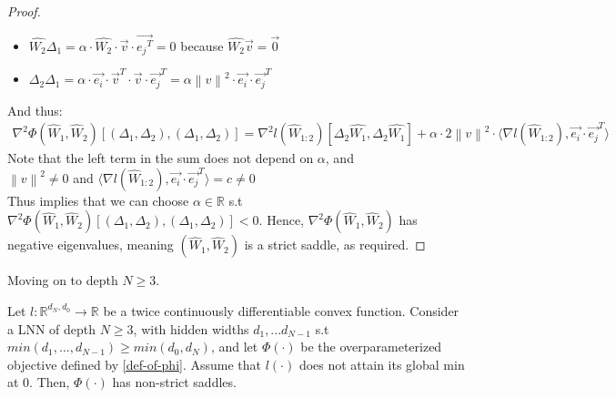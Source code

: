 \documentclass[12pt]{article}
\newcommand{\norm}[1]{\left\| #1 \right\|}
\begin{document}
\begin{proof}
\begin{itemize}
        \item $\widehat{W_2}\Delta_1 = \alpha \cdot \widehat{W_2} \cdot \overrightarrow{v} \cdot \overrightarrow{{e_j}^T} = 0$ because $\widehat{W_2}\overrightarrow{v} = \overrightarrow{0}$
        \item $\Delta_2 \Delta_1 = 
        \alpha \cdot \overrightarrow{e_i} \cdot {\overrightarrow{v}^T}
        \cdot \overrightarrow{v} \cdot {\overrightarrow{e_j}^T} = 
        \alpha {\norm{v}^2} \cdot \overrightarrow{e_i}\cdot{\overrightarrow{e_j}^T}$
    \end{itemize}
    And thus:
    \begin{align*}
        {{\nabla}^{2}}{\Phi}({\widehat{W}_1}, {\widehat{W}_2})[
        (\Delta_1,\Delta_2),
        (\Delta_1,\Delta_2)
        ]
        =
        {{\nabla}^{2}}{l}({\widehat{W}_{1:2}})[
         {\Delta_2}\widehat{W_1},
         {\Delta_2}\widehat{W_1}
        ]
        +
        \alpha \cdot 2 \norm{v}^2 \cdot \langle
        {\nabla}{l}({\widehat{W}_{1:2}})
        ,
        \overrightarrow{e_i}\cdot{\overrightarrow{e_j}^T}
        \rangle
    \end{align*}
    Note that the left term in the sum does not depend on $\alpha$, and \\ ${\norm{v}^2}\neq 0$ and $\langle
    {\nabla}{l}({\widehat{W}_{1:2}})
    ,
    \overrightarrow{e_i}\cdot{\overrightarrow{e_j}^T}
    \rangle = c \neq 0$
    \\ 
    Thus implies that we can choose $\alpha \in \mathbb{R}$ s.t 
    ${{\nabla}^{2}}{\Phi{({\widehat{W}_1}, {\widehat{W}_2})}}[
        (\Delta_1,\Delta_2),
        (\Delta_1,\Delta_2)
        ] < 0$. Hence, ${{\nabla}^{2}}{\Phi}({\widehat{W}_1}, {\widehat{W}_2})$ has negative eigenvalues, meaning $({\widehat{W}_1}, {\widehat{W}_2})$ is a strict saddle, as required.
    \end{proof}
    Moving on to depth $N \geq 3$.
    \begin{proposition}
    Let $l:\mathbb{R}^{d_N,d_0} \to \mathbb{R}$ be a twice continuously differentiable convex function. Consider a LNN of depth $N \geq 3$, with hidden widths $d_1, ... d_{N-1}$ s.t $min(d_1,...,d_{N-1}) \geq min(d_0, d_N)$,
    and let $\Phi(\cdot)$ be the overparameterized objective defined by \eqref{def-of-phi}.
    Assume that $l(\cdot)$ does not attain its global min at $0$.
    Then, $\Phi(\cdot)$ has non-strict saddles.
    \end{proposition}
	
\end{document}
